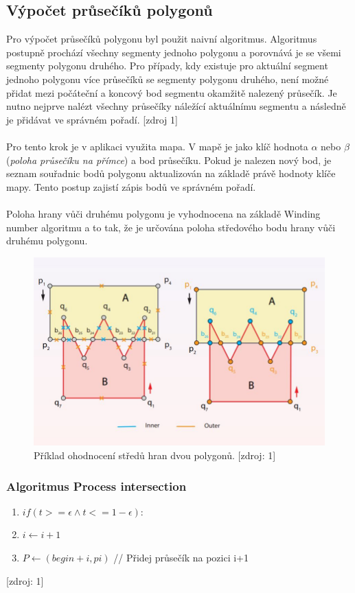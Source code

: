 \documentclass[a4paper, 12pt]{article}
\begin{document}
\subsection{Výpočet průsečíků polygonů}
Pro výpočet průsečíků polygonu byl použit naivní algoritmus. Algoritmus postupně prochází všechny segmenty jednoho polygonu a porovnává je se všemi segmenty polygonu druhého. Pro případy, kdy existuje pro aktuální segment jednoho polygonu více průsečíků se segmenty polygonu druhého, není možné přidat mezi počáteční a koncový bod segmentu okamžitě nalezený průsečík. Je nutno nejprve nalézt všechny průsečíky náležící aktuálnímu segmentu a následně je přidávat ve správném pořadí. [zdroj 1]\\
\\
Pro tento krok je v aplikaci využita mapa. V mapě je jako klíč hodnota $\alpha$ nebo $\beta$ (\textit{poloha průsečíku na přímce}) a bod průsečíku. Pokud je nalezen nový bod, je seznam souřadnic bodů polygonu aktualizován na základě právě hodnoty klíče mapy. Tento postup zajistí zápis bodů ve správném pořadí. \\
\\
Poloha hrany vůči druhému polygonu je vyhodnocena na základě Winding number algoritmu a to tak, že je určována poloha středového bodu hrany vůči druhému polygonu. 

\begin{figure}[h!]
	\centering
	\includegraphics[width=12cm]{polygon_pruseciky.jpg}
	\caption{Příklad ohodnocení středů hran dvou polygonů. [zdroj: 1]}
\end{figure}

\subsubsection{Algoritmus Process intersection}
\begin{enumerate}
\item $ if (t >= \epsilon \land t <= 1- \epsilon): $ 
	\item \hspace {1cm} $ i \longleftarrow i+1 $
	\item \hspace {1cm}  $ P \longleftarrow (begin + i,pi)$ // Přidej průsečík na pozici i+1
\end{enumerate}[zdroj: 1]
\end{document}
